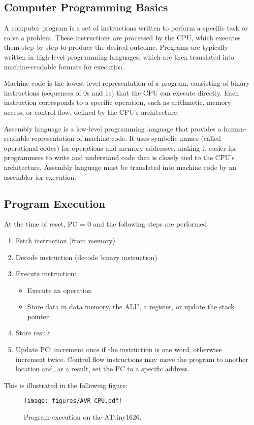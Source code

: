 \documentclass{article}
\begin{document}
\subsection{Computer Programming Basics}
A computer program is a set of instructions written to perform a
specific task or solve a problem. These instructions are processed by
the CPU, which executes them step by step to produce the desired
outcome. Programs are typically written in high-level programming
languages, which are then translated into machine-readable formats for
execution.
\begin{definition}
    Machine code is the lowest-level representation of a program,
    consisting of binary instructions (sequences of 0s and 1s) that the
    CPU can execute directly. Each instruction corresponds to a specific
    operation, such as arithmetic, memory access, or control flow,
    defined by the CPU's architecture.
\end{definition}
\begin{definition}
    Assembly language is a low-level programming language that provides
    a human-readable representation of machine code. It uses symbolic
    names (called operational codes) for operations and memory
    addresses, making it easier for programmers to write and understand
    code that is closely tied to the CPU's architecture. Assembly
    language must be translated into machine code by an assembler for
    execution.
\end{definition}
\subsection{Program Execution}
At the time of reset, PC = 0 and the following steps are performed:
\begin{enumerate}
    \item Fetch instruction (from memory)
    \item Decode instruction (decode binary instruction)
    \item Execute instruction:
          \begin{itemize}
              \item Execute an operation
              \item Store data in data memory, the ALU, a register, or
                    update the stack pointer
          \end{itemize}
    \item Store result
    \item Update PC: increment once if the instruction is one word,
          otherwise increment twice. Control flow instructions may move
          the program to another location and, as a result, set the PC
          to a specific address.
\end{enumerate}
This is illustrated in the following figure:
\begin{figure}[H]
    \centering
    \texttt{[image: figures/AVR\_CPU.pdf]}
    \caption{Program execution on the ATtiny1626.} %
\end{figure}
\end{document}
